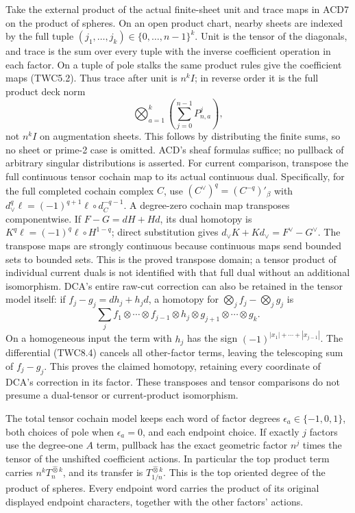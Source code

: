 Take the external product of the actual finite-sheet unit and trace maps
in ACD7 on the product of spheres. On an open product chart, nearby
sheets are indexed by the full tuple
\((j_1,\ldots,j_k)\in\{0,\ldots,n-1\}^k\). Unit is the tensor of the
diagonals, and trace is the sum over every tuple with the inverse
coefficient operation in each factor. On a tuple of pole stalks the same
product rules give the coefficient maps (TWC5.2). Thus trace after unit
is \(n^kI\); in reverse order it is the full product deck norm \[
\bigotimes_{a=1}^k\left(\sum_{j=0}^{n-1}P_{n,a}^j\right),
\tag{TWC9.2}
\] not \(n^kI\) on augmentation sheets. This follows by distributing the
finite sums, so no sheet or prime-2 case is omitted. ACD's sheaf
formulas suffice; no pullback of arbitrary singular distributions is
asserted. For current comparison, transpose the full continuous tensor
cochain map to its actual continuous dual. Specifically, for the full
completed cochain complex \(C\), use \((C^\vee)^q=(C^{-q})'_\beta\) with
\(d_\vee^q\ell=(-1)^{q+1}\ell\circ d_C^{-q-1}\). A degree-zero cochain
map transposes componentwise. If \(F-G=dH+Hd\), its dual homotopy is
\(K^q\ell=(-1)^q\ell\circ H^{1-q}\); direct substitution gives
\(d_\vee K+Kd_\vee=F^\vee-G^\vee\). The transpose maps are strongly
continuous because continuous maps send bounded sets to bounded sets.
This is the proved transpose domain; a tensor product of individual
current duals is not identified with that full dual without an
additional isomorphism. DCA's entire raw-cut correction can also be
retained in the tensor model itself: if \(f_j-g_j=dh_j+h_jd\), a
homotopy for \(\bigotimes_jf_j-\bigotimes_jg_j\) is \[
\sum_j f_1\otimes\cdots\otimes f_{j-1}\otimes h_j\otimes g_{j+1}\otimes\cdots\otimes g_k.
\] On a homogeneous input the term with \(h_j\) has the sign
\((-1)^{|x_1|+\cdots+|x_{j-1}|}\). The differential (TWC8.4) cancels all
other-factor terms, leaving the telescoping sum of \(f_j-g_j\). This
proves the claimed homotopy, retaining every coordinate of DCA's
correction in its factor. These transposes and tensor comparisons do not
presume a dual-tensor or current-product isomorphism.

The total tensor cochain model keeps each word of factor degrees
\(\epsilon_a\in\{-1,0,1\}\), both choices of pole when \(\epsilon_a=0\),
and each endpoint choice. If exactly \(j\) factors use the degree-one
\(A\) term, pullback has the exact geometric factor \(n^j\) times the
tensor of the unshifted coefficient actions. In particular the top
product term carries \(n^k T_n^{\widehat\otimes k}\), and its transfer
is \(T_{1/n}^{\widehat\otimes k}\). This is the top oriented degree of
the product of spheres. Every endpoint word carries the product of its
original displayed endpoint characters, together with the other factors'
actions.

